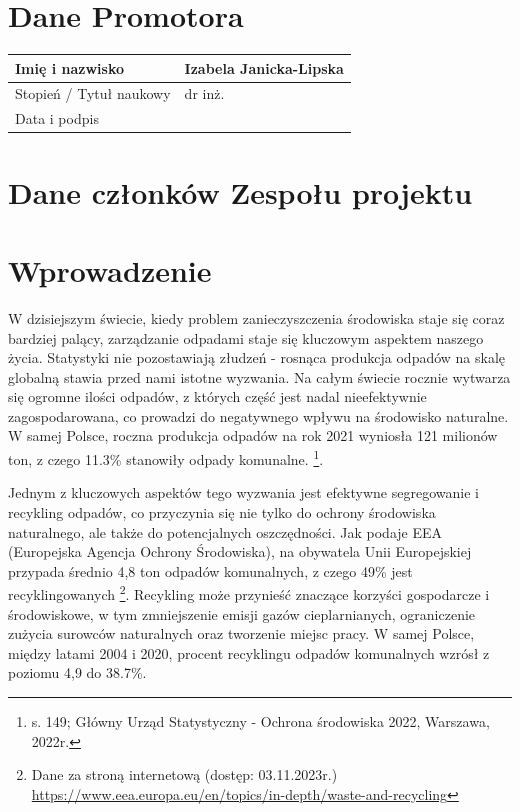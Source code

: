 \documentclass[12pt, a4paper, twoside, openany]{book}
\newcommand{\forceindent}{\leavevmode{\parindent=1.3em\indent}}
\begin{document}
\section{Dane Promotora}

\noindent
\begin{tabular}{ |p{5cm}|p{7cm}|}
    \hline
    Imię i nazwisko         & Izabela Janicka-Lipska \\
    \hline
    Stopień / Tytuł naukowy & dr inż.               \\
    \hline
    Data i podpis           &                        \\ \hline
\end{tabular}

\section{Dane członków Zespołu projektu}

\membersTable

\section{Wprowadzenie}
\forceindent W dzisiejszym świecie, kiedy problem zanieczyszczenia środowiska staje się coraz bardziej palący, zarządzanie odpadami staje się kluczowym aspektem naszego życia. Statystyki nie pozostawiają złudzeń - rosnąca produkcja odpadów na skalę globalną stawia przed nami istotne wyzwania. Na całym świecie rocznie wytwarza się ogromne ilości odpadów, z których część jest nadal nieefektywnie zagospodarowana, co prowadzi do negatywnego wpływu na środowisko naturalne. W samej Polsce, roczna produkcja odpadów na rok 2021 wyniosła 121 milionów ton, z czego 11.3\% stanowiły odpady komunalne. \footnote{s. 149; Główny Urząd Statystyczny - Ochrona środowiska 2022, Warszawa, 2022r.}.

Jednym z kluczowych aspektów tego wyzwania jest efektywne segregowanie i recykling odpadów, co przyczynia się nie tylko do ochrony środowiska naturalnego, ale także do potencjalnych oszczędności. Jak podaje EEA (Europejska Agencja Ochrony Środowiska), na obywatela Unii Europejskiej przypada średnio 4,8 ton odpadów komunalnych, z czego 49\% jest recyklingowanych \footnote{Dane za stroną internetową (dostęp: 03.11.2023r.) \url{https://www.eea.europa.eu/en/topics/in-depth/waste-and-recycling}}. Recykling może przynieść znaczące korzyści gospodarcze i środowiskowe, w tym zmniejszenie emisji gazów cieplarnianych, ograniczenie zużycia surowców naturalnych oraz tworzenie miejsc pracy. W samej Polsce, między latami 2004 i 2020, procent recyklingu odpadów komunalnych wzrósł z poziomu 4,9 do 38.7\%.
\end{document}
